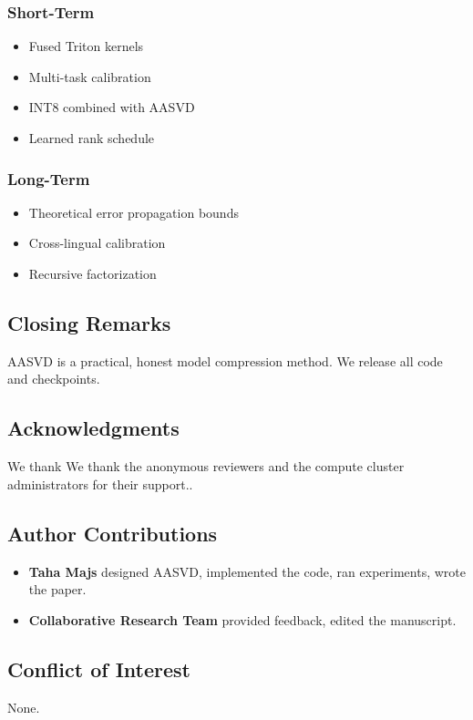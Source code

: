 \subsubsection{Short-Term}
\begin{itemize}
\item Fused Triton kernels
\item Multi-task calibration
\item INT8 combined with AASVD
\item Learned rank schedule

\end{itemize}
\subsubsection{Long-Term}
\begin{itemize}
\item Theoretical error propagation bounds
\item Cross-lingual calibration
\item Recursive factorization

\end{itemize}
\subsection{Closing Remarks}

AASVD is a practical, honest model compression method. We release all code 
and checkpoints.

\subsection{Acknowledgments}

We thank We thank the anonymous reviewers and the compute cluster administrators for their support..

\subsection{Author Contributions}

\begin{itemize}
\item \textbf{Taha Majs} designed AASVD, implemented the code, ran experiments,
  wrote the paper.
\item \textbf{Collaborative Research Team} provided feedback, edited the manuscript.

\end{itemize}
\subsection{Conflict of Interest}

None.